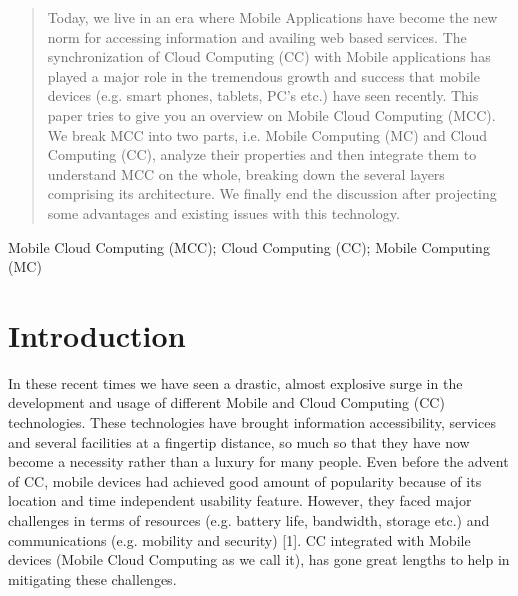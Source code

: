 \documentclass[10pt, conference, compsocconf]{IEEEtran}
\begin{document}
\begin{abstract}
Today, we live in an era where Mobile Applications have become the new norm for accessing information and availing web based services. The synchronization of Cloud Computing (CC) with Mobile applications has played a major role in the tremendous growth and success that mobile devices (e.g. smart phones, tablets, PC's etc.) have seen recently. This paper tries to give you an overview on Mobile Cloud Computing (MCC). We break MCC into two parts, i.e. Mobile Computing (MC) and Cloud Computing (CC), analyze their properties and then integrate them to understand MCC on the whole, breaking down the several layers comprising its architecture. We finally end the discussion after projecting some advantages and existing issues with this technology.

\end{abstract}

\begin{IEEEkeywords}
Mobile Cloud Computing (MCC); Cloud Computing (CC); Mobile Computing (MC)

\end{IEEEkeywords}


%
\IEEEpeerreviewmaketitle



\section{Introduction}
In these recent times we have seen a drastic, almost explosive surge in the development and usage of different Mobile and Cloud Computing (CC) technologies. These technologies have brought information accessibility, services and several facilities at a fingertip distance, so much so that they have now become a necessity rather than a luxury for many people. Even before the advent of CC, mobile devices had achieved good amount of popularity because of its location and time independent usability feature. However, they faced major challenges in terms of resources (e.g. battery life, bandwidth, storage etc.) and communications (e.g. mobility and security) [1]. CC integrated with Mobile devices (Mobile Cloud Computing as we call it), has gone great lengths to help in mitigating these challenges.
\end{document}
